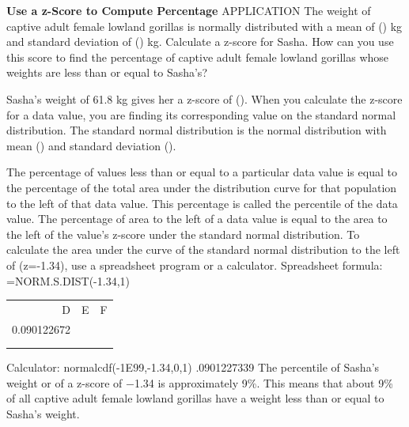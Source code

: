 \documentclass{article}
\newenvironment{example}[1]{}{}         %
\newcommand{\answer}[1]{}               %
\newcommand{\placeholder}[2]{}          %
\newcommand{\te}[1]{}                   %
\begin{document}
\begin{example}{4}
\textbf{Use a z-Score to Compute Percentage}
APPLICATION
The weight of captive adult female lowland gorillas is normally distributed with a mean of () kg and standard deviation of () kg. Calculate a z-score for Sasha. How can you use this score to find the percentage of captive adult female lowland gorillas whose weights are less than or equal to Sasha's?
\placeholder{photo}{Adult female gorilla Sasha holding a young gorilla; caption Adult female Sasha weighs 61.8 kg.}
Sasha's weight of 61.8 kg gives her a z-score of ().
When you calculate the z-score for a data value, you are finding its corresponding value on the standard normal distribution. The standard normal distribution is the normal distribution with mean () and standard deviation ().
\te{LOOK FOR RELATIONSHIPS (z=\frac{x-\mu}{\sigma}). The formula for the z-score can be used to determine part of the transformation of the standard normal distribution into the normal distribution with mean (\mu) and standard deviation (\sigma). For example, there is a horizontal translation of (\mu) units.}
\placeholder{graph}{Standard Normal Distribution. Red bell curve peaks at 0, horizontal labels -4 through 4 at integers, vertical guides at integers. Red vertical at z approximately -1.34 and shaded left-tail area; z labeled below that marker. No vertical scale or arrows.}
\te{Callout: The total area under the curve of the standard normal distribution is equal to 1, and represents 100\% of the data values.}
The percentage of values less than or equal to a particular data value is equal to the percentage of the total area under the distribution curve for that population to the left of that data value. This percentage is called the percentile of the data value. The percentage of area to the left of a data value is equal to the area to the left of the value's z-score under the standard normal distribution.
To calculate the area under the curve of the standard normal distribution to the left of (z=-1.34), use a spreadsheet program or a calculator.
Spreadsheet formula: =NORM.S.DIST(-1.34,1)
\begin{tabular}{rrr}
D & E & F \\
0.090122672 & & \\
 & & \\
 & & \\
\end{tabular}
Calculator: normalcdf(-1E99,-1.34,0,1)
.0901227339
The percentile of Sasha's weight or of a z-score of −1.34 is approximately 9\%. This means that about 9\% of all captive adult female lowland gorillas have a weight less than or equal to Sasha's weight.
\answer{(z\approx-1.34); approximately 9\%.}
\end{example}
\end{document}
